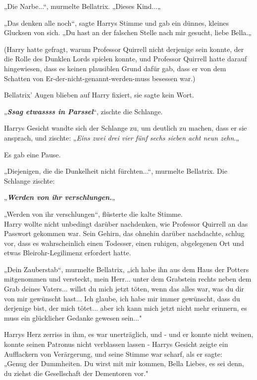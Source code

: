 {„Die Narbe...“, murmelte Bellatrix. „Dieses Kind...„

„Das denken alle noch“, sagte Harrys Stimme und gab ein dünnes, kleines Glucksen von sich. „Du hast an der falschen Stelle nach mir gesucht, liebe Bella.„

(Harry hatte gefragt, warum Professor Quirrell nicht derjenige sein konnte, der die Rolle des Dunklen Lords spielen konnte, und Professor Quirrell hatte darauf hingewiesen, dass es keinen plausiblen Grund dafür gab, dass er von dem Schatten von Er-der-nicht-genannt-werden-muss besessen war.)

Bellatrix' Augen blieben auf Harry fixiert, sie sagte kein Wort.

„\textbf{\emph{Ssag etwassss in Parssel}}“, zischte die Schlange.

Harrys Gesicht wandte sich der Schlange zu, um deutlich zu machen, dass er sie ansprach, und zischte: „\emph{Eins zwei drei vier fünf sechs sieben acht neun zehn}.„

Es gab eine Pause.

„Diejenigen, die die Dunkelheit nicht fürchten...“, murmelte Bellatrix. Die Schlange zischte:

„\textbf{\emph{Werden von ihr verschlungen.}}„

„Werden von ihr verschlungen“, flüsterte die kalte Stimme.\\ Harry wollte nicht unbedingt darüber nachdenken, wie Professor Quirrell an das Passwort gekommen war. Sein Gehirn, das ohnehin darüber nachdachte, schlug vor, dass es wahrscheinlich einen Todesser, einen ruhigen, abgelegenen Ort und etwas Bleirohr-Legilimenz erfordert hatte.

„Dein Zauberstab“, murmelte Bellatrix, „ich habe ihn aus dem Haus der Potters mitgenommen und versteckt, mein Herr... unter dem Grabstein rechts neben dem Grab deines Vaters... willst du mich jetzt töten, wenn das alles war, was du dir von mir gewünscht hast... Ich glaube, ich habe mir immer gewünscht, dass du derjenige bist, der mich tötet... aber ich kann mich jetzt nicht mehr erinnern, es muss ein glücklicher Gedanke gewesen sein..."

Harrys Herz zerriss in ihm, es war unerträglich, und - und er konnte nicht weinen, konnte seinen Patronus nicht verblassen lassen - Harrys Gesicht zeigte ein Aufflackern von Verärgerung, und seine Stimme war scharf, als er sagte:\\ „Genug der Dummheiten. Du wirst mit mir kommen, Bella Liebes, es sei denn, du ziehst die Gesellschaft der Dementoren vor."

}
